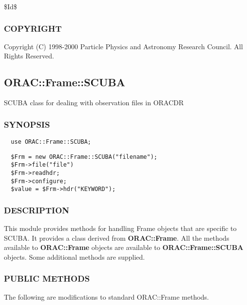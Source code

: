 \$Id\$

\subsubsection*{COPYRIGHT\label{ORAC::Frame::UKIRT_COPYRIGHT}}


Copyright (C) 1998-2000 Particle Physics and Astronomy Research
Council. All Rights Reserved.

\subsection{ORAC::Frame::SCUBA\label{ORAC::Frame::SCUBA}}


SCUBA class for dealing with observation files in ORACDR

\subsubsection*{SYNOPSIS\label{ORAC::Frame::SCUBA_SYNOPSIS}}
\begin{verbatim}
  use ORAC::Frame::SCUBA;
\end{verbatim}
\begin{verbatim}
  $Frm = new ORAC::Frame::SCUBA("filename");
  $Frm->file("file")
  $Frm->readhdr;
  $Frm->configure;
  $value = $Frm->hdr("KEYWORD");
\end{verbatim}
\subsubsection*{DESCRIPTION\label{ORAC::Frame::SCUBA_DESCRIPTION}}


This module provides methods for handling Frame objects that
are specific to SCUBA. It provides a class derived from \textbf{ORAC::Frame}.
All the methods available to \textbf{ORAC::Frame} objects are available
to \textbf{ORAC::Frame::SCUBA} objects. Some additional methods are supplied.

\subsubsection*{PUBLIC METHODS\label{ORAC::Frame::SCUBA_PUBLIC_METHODS}}


The following are modifications to standard ORAC::Frame methods.

